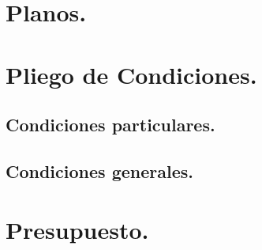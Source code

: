 \documentclass[a4paper,10pt]{article}
\begin{document}
\section{Planos.}
\section{Pliego de Condiciones.}
\subsection{Condiciones particulares.}
\subsection{Condiciones generales.}
\section{Presupuesto.}
\end{document}
